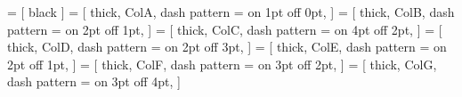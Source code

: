  = [
black
]
 = [
thick, ColA, dash pattern = {on 1pt off 0pt},
]
 = [
thick, ColB, dash pattern = {on 2pt off 1pt},
]
 = [
thick, ColC, dash pattern = {on 4pt off 2pt},
]
 = [
thick, ColD, dash pattern = {on 2pt off 3pt},
]
 = [
thick, ColE, dash pattern = {on 2pt off 1pt},
]
 = [
thick, ColF, dash pattern = {on 3pt off 2pt},
]
 = [
thick, ColG, dash pattern = {on 3pt off 4pt},
]
